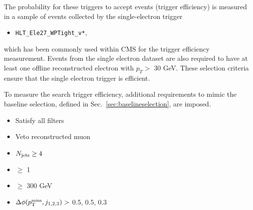 The probability for these triggers to accept events (trigger efficiency) is measured in a sample of events collected by the single-electron trigger
\begin{itemize}
  \item \texttt{HLT\_Ele27\_WPTight\_v*},
\end{itemize}
which has been commonly used within CMS for the \MET trigger efficiency measurement. Events from the single electron dataset are also required to have at least one offline reconstructed electron with $p_{T}>$ 30 GeV. These selection criteria ensure that the single electron trigger is efficient. 

To measure the search trigger efficiency, additional requirements to mimic the baseline selection, defined in Sec.~\ref{sec:baselineselection}, are imposed.
\begin{itemize}
  \item Satisfy all filters
  \item Veto reconstructed muon
  \item $N_{\text{jets}}\geq4$
  \item \nbjets $\ge$ 1
  \item \HT $\ge$ 300 GeV
  \item $\Delta\phi(p^{\rm miss}_{\rm T}, j_{1,2,3})>$ 0.5, 0.5, 0.3
\end{itemize}

